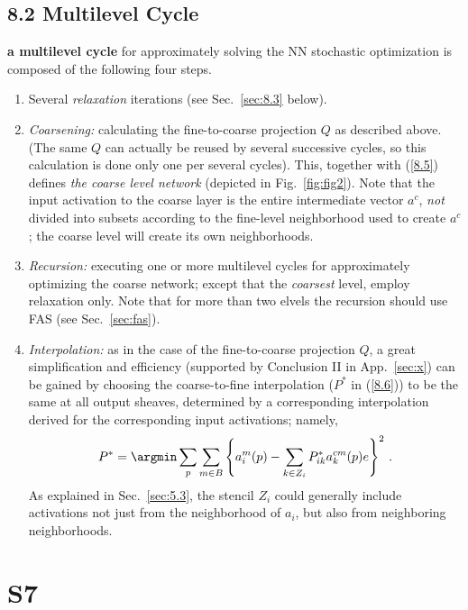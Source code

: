 \documentclass{article} %
\begin{document}
\subsection{8.2 Multilevel Cycle}
\label{sec:multilevel_cycle}
{\bf a multilevel cycle} for approximately solving the NN stochastic optimization is composed of the following four steps.
\begin{enumerate}
    \item Several {\it relaxation} iterations (see Sec.~\ref{sec:8.3} below).
    \item {\it Coarsening:} calculating the fine-to-coarse projection $Q$ as described above. (The same $Q$ can actually be reused by several successive cycles, so this calculation is done only one per several cycles). This, together with (\ref{8.5}) defines {\it the coarse level network} (depicted in Fig.~\ref{fig:fig2}). Note that the input activation to the coarse layer is the entire intermediate vector $a^c$, {\it not} divided into subsets according to the fine-level neighborhood used to create $a^c$; the coarse level will create its own neighborhoods.
    \item {\it Recursion:} executing one or more multilevel cycles for approximately optimizing the coarse network; except that the {\it coarsest} level, employ relaxation only. Note that for more than two elvels the recursion should use FAS (see Sec.~\ref{sec:fas}).
    \item {\it Interpolation:} as in the case of the fine-to-coarse projection $Q$, a great simplification and efficiency (supported by Conclusion II in App.~\ref{sec:x}) can be gained by choosing the coarse-to-fine interpolation ($P^*$ in (\ref{8.6})) to be the same at all output sheaves, determined by a corresponding interpolation derived for the corresponding input activations; namely,
    \begin{equation}
        P^* = \argmin \sum_p \sum_{m \in B} \left\{ a^m_i(p) - \sum_{k \in Z_i} P^*_{ik} a^{cm}_k(p)e\right\}^2\,.
        \label{pstar_fit}
    \end{equation}
    As explained in Sec.~\ref{sec:5.3}, the stencil $Z_i$ could generally include activations not just from the neighborhood of $a_i$, but also from neighboring neighborhoods.
\end{enumerate}

\section{S7}
\end{document}
